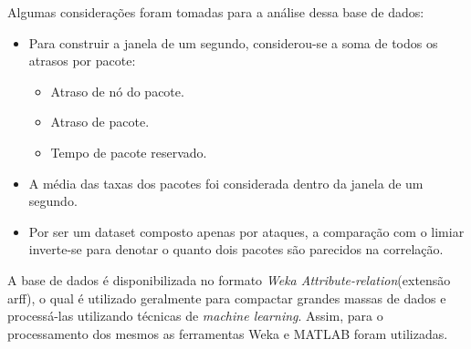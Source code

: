 Algumas considerações foram tomadas para a análise dessa base de dados:
\begin{itemize}
	\item Para construir a janela de um segundo, considerou-se a soma de todos os atrasos por pacote:
	\begin{itemize}
	 \item Atraso de nó do pacote.
	 \item  Atraso de pacote.
	 \item Tempo de pacote reservado.
	\end{itemize}
	\item A média das taxas dos pacotes foi considerada dentro da janela de um segundo.
	\item Por ser um dataset composto apenas por ataques, a comparação com o limiar inverte-se para denotar o quanto dois pacotes são parecidos na correlação.
\end{itemize}

A base de dados é disponibilizada no formato \textit{Weka Attribute-relation}(extensão arff), o qual é utilizado geralmente para compactar grandes massas de dados e processá-las utilizando técnicas de \textit{machine learning}. Assim, para o processamento dos mesmos as ferramentas Weka e MATLAB foram utilizadas.